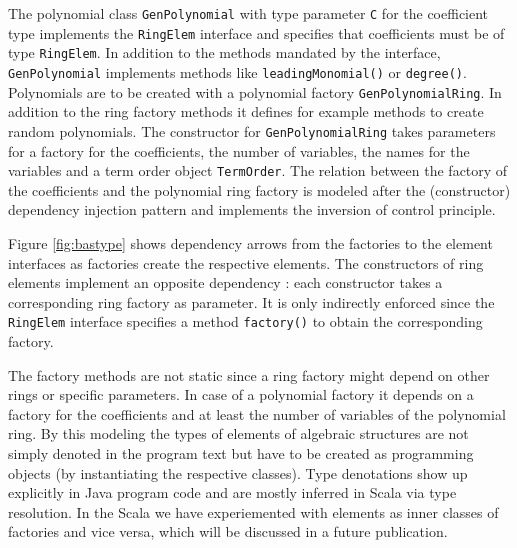 \documentclass{llncs}
\newcommand{\code}[1]{\texttt{#1}}
\begin{document}

The polynomial class \code{Gen\-Polynomial} with type parameter
\code{C} for the coefficient type implements the \code{Ring\-Elem}
interface and specifies that coefficients must be of type
\code{Ring\-Elem}.  In addition to the methods mandated by the
interface, \code{Gen\-Polynomial} implements methods like
\code{leading\-Monomial()} or \code{degree()}.  Polynomials are to be
created with a polynomial factory \code{Gen\-Polynomial\-Ring}. In
addition to the ring factory methods it defines for example methods
to create random polynomials.  The constructor for
\code{Gen\-Polynomial\-Ring} takes parameters for a factory for the
coefficients, the number of variables, the names for the variables and
a term order object \code{Term\-Order}. The relation between the
factory of the coefficients and the polynomial ring factory is modeled
after the (constructor) dependency injection pattern and implements the
inversion of control principle.

Figure \ref{fig:bastype} shows dependency arrows from the factories to
the element interfaces as factories create the respective elements.
The constructors of ring elements implement an opposite
dependency : each constructor takes a corresponding ring
factory as parameter.  It is only indirectly enforced since the
\code{RingElem} interface specifies a method \code{factory()} to
obtain the corresponding factory.

The factory methods are not static 
since a ring factory might depend on other rings or specific
parameters. In case of a polynomial factory it depends on a factory
for the coefficients and at least the number of variables of the
polynomial ring. By this modeling the types of elements of algebraic
structures are not simply denoted in the program text but have to be
created as programming objects (by instantiating the respective
classes). Type denotations show up explicitly in Java program code and
are mostly inferred in Scala via type resolution. In the Scala we have
experiemented with elements as inner classes of factories and vice
versa, which will be discussed in a future publication.
\end{document}
